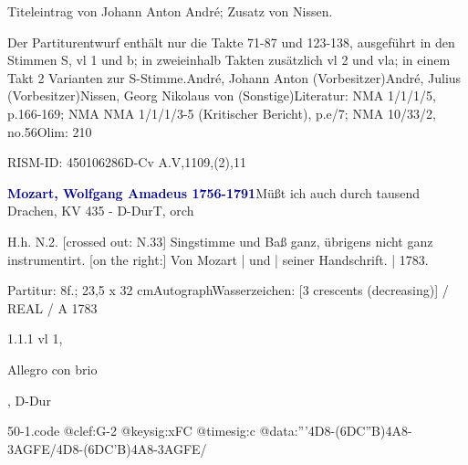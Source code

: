 \documentclass[a4paper, twocolumn, 11pt]{book}
\begin{document}
\newline %
\par Titeleintrag von Johann Anton André; Zusatz von Nissen.
\par Der Partiturentwurf enthält nur die Takte 71-87 und 123-138, ausgeführt in den Stimmen S, vl 1 und b; in zweieinhalb Takten zusätzlich vl 2 und vla; in einem Takt 2 Varianten zur S-Stimme.\newline André, Johann Anton  (Vorbesitzer)\newline André, Julius  (Vorbesitzer)\newline Nissen, Georg Nikolaus von  (Sonstige)\newline Literatur: NMA  1/1/1/5, p.166-169; NMA  NMA 1/1/1/3-5 (Kritischer Bericht), p.e/7; NMA  10/33/2, no.56\newline Olim: 210
\par RISM-ID: 450106286\newline D-Cv  A.V,1109,(2),11
\par \vspace{16pt} \textcolor{darkblue}{\textbf{Mozart, Wolfgang Amadeus  1756-1791}}\hfillplus{[50]}\newline Müßt ich auch durch tausend Drachen, KV 435 - D-Dur\newline T, orch
\par \begin{itshape} H.h. N.2. [crossed out: N.33] Singstimme und Baß ganz, übrigens nicht ganz instrumentirt. [on the right:] Von Mozart | und | seiner Handschrift. | 1783.\end{itshape} 
\par \textcolor{darkblue}{}  Partitur: 8f.; 23,5 x 32 cm\newline Autograph\newline Wasserzeichen: [3 crescents (decreasing)] / REAL / A  1783
\par 1.1.1  vl 1, \begin{itshape}Allegro con brio\end{itshape}, D-Dur  
\begin{filecontents*}{50-1.code}
@clef:G-2
@keysig:xFC
@timesig:c
@data:'''4D8-(6{DC''B})4A8-{3AGFE}/4D8-(6{DC'B})4A8-{3AGFE}/
\end{filecontents*}
\end{document}
